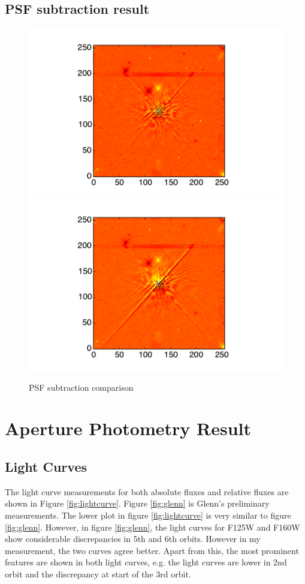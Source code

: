 \documentclass[paper=letter, fontsize=11pt]{scrartcl} %
\numberwithin{equation}{section} %
\numberwithin{figure}{section} %
\numberwithin{table}{section} %
\begin{document}
\subsection{PSF subtraction result}
\begin{figure}
  \centering
  \includegraphics[width=\textwidth]{cc_example}
  \includegraphics[width=\textwidth]{wcs_example}
  \caption{PSF subtraction comparison}\label{fig:subcomp}
\end{figure}
\section{Aperture Photometry Result}
\subsection{Light Curves}

The light curve measurements for both absolute fluxes and relative
fluxes are shown in Figure \ref{fig:lightcurve}. Figure
\ref{fig:glenn} is Glenn's preliminary measurements. The lower plot in
figure \ref{fig:lightcurve} is very similar to figure
\ref{fig:glenn}. However, in figure \ref{fig:glenn}, the light curves
for F125W and F160W show considerable discrepancies in 5th and 6th
orbits. However in my measurement, the two curves agree better. Apart
from this, the most prominent features are shown in both light
curves, e.g. the light curves are lower in 2nd orbit and the
discrepancy at start of the 3rd orbit.
\end{document}
